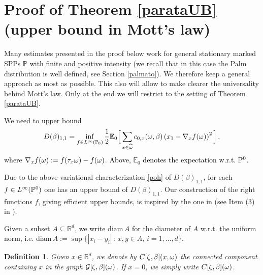 \documentclass[12pt,a4paper,reqno]{amsart}
\newtheorem{Fact}[Theorem]{Fact}
\newtheorem{Definition}[Theorem]{Definition}
\newcommand{\cG}{\ensuremath{\mathcal G}}
\newcommand{\bbE}{{\ensuremath{\mathbb E}} }
\newcommand{\bbN}{{\ensuremath{\mathbb N}} }
\newcommand{\bbP}{{\ensuremath{\mathbb P}} }
\newcommand{\bbR}{{\ensuremath{\mathbb R}} }
\let\a=\alpha \let\b=\beta   \let\d=\delta  \let\e=\varepsilon
\newcommand{\vvv}{\textcolor{black}} %
\newcommand{\orc}{\textcolor{black}} %
\newcommand{\be}{\begin{equation}}
\newcommand{\en}{\end{equation}}
\newcommand{\vpz}{\vvv{\bbP^{\hspace{0.013cm}0} }}
\begin{document}
  
  
  
%
%
%


\section{Proof of Theorem \ref{parataUB} (upper bound in Mott's law)}\label{sec_UB}
Many estimates presented in the proof below work for  general stationary marked SPPs \orc{$\bbP$} with finite and positive intensity (we recall that in this case the Palm distribution is well defined, see Section \ref{palmato}). We therefore  keep a general approach as most as possible. This also will allow to make clearer  the universality behind Mott's law.
 Only at the end we will restrict to the setting of Theorem \ref{parataUB}. 


We need to upper bound 
 \begin{equation}\label{poh}
 D(\b)_{1,1} =\inf _{ f\in L^\infty(\bbP_0) } \frac{1}{2}\bbE_0 \Big[
 \sum_{x\in \widehat \o}  c_{0,x}(\o,\b) \left
 (x_1 - \nabla_x f (\o) 
\right)^2\Big]\,,
 \end{equation}
 where $\nabla_x f (\omega) := f(\tau_x \omega) - f(\omega)$.  \orc{Above, $\bbE_0$ denotes the expectation w.r.t. $\vpz$}.
 
 Due to the above variational characterization \eqref{poh} of $D(\b)_{1,1}$, for each $f\in L^\infty (\vpz)$ one has an upper bound of $D(\b)_{1,1}$. Our construction of the right functions $f$, giving efficient upper bounds, is inspired by the one in \cite{PR} (see Item (3) in
  \cite[Proof~of~Thm.~3.12]{PR}).
 
\medskip


Given a subset 
$A\subseteq\bbR^d$, we write  $\text{diam}\,A$ for the diameter of $A$ w.r.t. the uniform norm, i.e. $\text{diam}\,A:=\sup\{|x_i-y_i|\,:\,x,y\in A,\,i=1,\ldots,d\}$.  
\begin{Definition}%
 Given $x\in\bbR^d$, we denote by $C[\z,\b](x,\o)$   the connected component  containing  $x$ in the graph $\cG[\z,\b](\o)$.  If $x=0$, we simply  write  $C[\z,\b](\o)$.
 \end{Definition}

%
%
\end{document}
